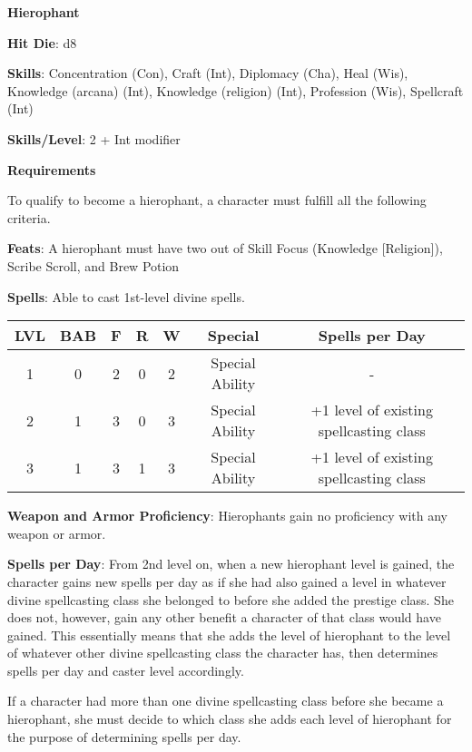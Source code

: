 \textbf{\huge{Hierophant}}

\textbf{Hit Die}: d8

\textbf{Skills}: Concentration (Con), Craft (Int), Diplomacy (Cha), Heal (Wis), Knowledge (arcana) (Int), Knowledge (religion) (Int), Profession (Wis), Spellcraft (Int)

\textbf{Skills/Level}: 2 + Int modifier

\textbf{\large{Requirements}}

To qualify to become a hierophant, a character must fulfill all the following criteria.

\textbf{Feats}: A hierophant must have two out of Skill Focus (Knowledge [Religion]), Scribe Scroll, and Brew Potion

\textbf{Spells}: Able to cast 1st-level divine spells.

\begin{center}
\begin{adjustwidth}{-4cm}{}
\begin{small}
\begin{tabular}{| c | c | c | c | c | c | c |}
\hline
LVL &BAB &F &R &W &Special &Spells per Day \\
\hline
1 &0 &2 &0 &2 &Special Ability &- \\
2 &1 &3 &0 &3 &Special Ability &+1 level of existing spellcasting class \\
3 &1 &3 &1 &3 &Special Ability &+1 level of existing spellcasting class \\
\hline
\end{tabular}
\end{small}
\end{adjustwidth}
\end{center}

\textbf{Weapon and Armor Proficiency}: Hierophants gain no proficiency with any weapon or armor.

\textbf{Spells per Day}: From 2nd level on, when a new hierophant level is gained, the character gains new spells per day as if she had also gained a level in whatever divine spellcasting class she belonged to before she added the prestige class. She does not, however, gain any other benefit a character of that class would have gained. This essentially means that she adds the level of hierophant to the level of whatever other divine spellcasting class the character has, then determines spells per day and caster level accordingly.

If a character had more than one divine spellcasting class before she became a hierophant, she must decide to which class she adds each level of hierophant for the purpose of determining spells per day.


